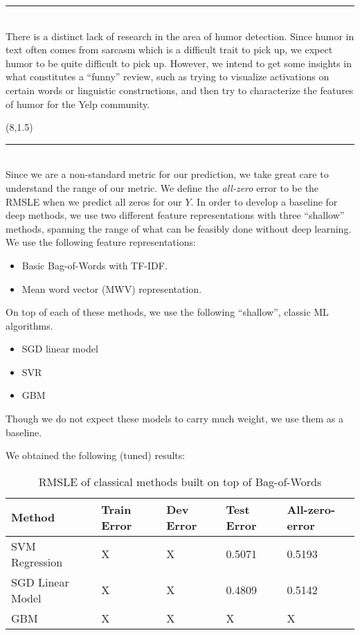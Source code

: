 \documentclass[a0]{a0poster}
\def\Head#1{\noindent{\LARGE\color{bluegray} #1}\bigskip}
\begin{document}
\begin{textblock}{7.0}
\medskip
\hrule\medskip
\Head{Work in Humor Detection}\\

There is a distinct lack of research in the area of humor detection. Since humor in text often comes from sarcasm which is a difficult trait to pick up, we expect humor to be quite difficult to pick up. However, we intend to get some insights in what constitutes a ``funny'' review, such as trying to visualize activations on certain words or linguistic constructions, and then try to characterize the features of humor for the Yelp community.
\end{textblock}

\begin{textblock}{7.0}(8,1.5)
\hrule\medskip
\Head{Baselines}\\
Since we are a non-standard metric for our prediction, we take great care to understand the range of our metric. We define the \emph{all-zero} error to be the RMSLE when we predict all zeros for our $Y$. In order to develop a baseline for deep methods, we use two different feature representations with three ``shallow'' methods, spanning the range of what can be feasibly done without deep learning. We use the following feature representations:

\begin{itemize}
    \item Basic Bag-of-Words with TF-IDF.
    \item Mean word vector (MWV) representation.
\end{itemize}

On top of each of these methods, we use the following ``shallow'', classic ML algorithms.

\begin{itemize}
    \item SGD linear model
    \item SVR
    \item GBM
\end{itemize}

Though we do not expect these models to carry much weight, we use them as a baseline. 

We obtained the following (tuned) results:

\begin{table}[h]
\centering
\vspace{2ex}
\begin{tabular}{l l l l l}
\textbf{Method} & \textbf{Train Error} & \textbf{Dev Error} & \textbf{Test Error} & \textbf{All-zero-error}\tabularnewline
\hline
SVM Regression & X & X & 0.5071 & 0.5193\tabularnewline
\hline
SGD Linear Model & X & X & 0.4809 & 0.5142\tabularnewline
\hline
GBM & X & X & X & X\tabularnewline
\hline
\end{tabular}
\caption{RMSLE of classical methods built on top of Bag-of-Words}
\end{table}


\end{textblock}
\end{document}
